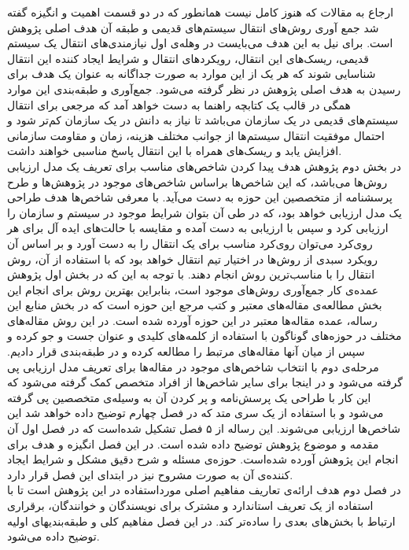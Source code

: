 ارجاع به مقالات که هنوز کامل نیست
همانطور که در دو قسمت اهمیت و انگیزه گفته شد جمع آوری روش‌های انتقال سیستم‌های قدیمی و طبقه آن هدف اصلی پژوهش است. برای نیل به این هدف می‌بایست در وهله‌ی اول نیازمندی‌های انتقال یک سیستم قدیمی، ریسک‌های این انتقال،  رویکردهای انتقال و شرایط ایجاد کننده این انتقال شناسایی شوند که هر یک از این موارد به صورت جداگانه  به عنوان یک هدف برای رسیدن به هدف اصلی پژوهش در نظر گرفته می‌شود. جمع‌آوری و طبقه‌بندی این موارد همگی در قالب یک کتابچه راهنما به دست خواهد آمد که مرجعی برای انتقال سیستم‌های قدیمی در یک سازمان ‌می‌باشد تا نیاز به دانش در یک سازمان کم‌تر شود و احتمال موفقیت انتقال سیستم‌ها از جوانب مختلف هزینه، زمان و 
مقاومت سازمانی افزایش یابد و ریسک‌های همراه با این انتقال پاسخ مناسبی خواهند داشت.
\\
در بخش دوم پژوهش هدف پیدا کردن شاخص‌های مناسب برای تعریف یک مدل ارزیابی روش‌ها می‌باشد، که این شاخص‌ها براساس شاخص‌های موجود در پژوهش‌ها و طرح پرسشنامه از متخصصین این حوزه به دست می‌آید. با معرفی شاخص‌ها هدف طراحی یک مدل ارزیابی خواهد بود، که در طی آن  بتوان شرایط موجود در سیستم و سازمان را ارزیابی کرد و سپس با ارزیابی به دست آمده و مقایسه با حالت‌های ایده آل برای هر روی‌کرد می‌توان روی‌کرد مناسب برای یک انتقال را به دست آورد و بر اساس آن رویکرد سبدی از روش‌ها در اختیار تیم انتقال خواهد بود که با استفاده از آن، روش انتقال را با مناسب‌ترین روش انجام دهند.
با توجه به این که در بخش اول پژوهش عمده‌ی کار جمع‌آوری روش‌های موجود است، بنابراین بهترین روش برای انجام این بخش مطالعه‌ی مقاله‌های معتبر و کتب مرجع این حوزه است که در بخش منابع این رساله، عمده مقاله‌ها معتبر در این حوزه آورده شده است. در این روش مقاله‌های مختلف در حوزه‌های گوناگون با استفاده از کلمه‌های کلیدی و عنوان  جست و جو کرده و سپس از میان   آنها مقاله‌های مرتبط را مطالعه کرده و در طبقه‌بندی قرار دادیم. مرحله‌ی دوم با انتخاب شاخص‌های موجود در مقاله‌ها برای تعریف مدل ارزیابی پی گرفته می‌شود و در اینجا برای سایر شاخص‌ها از افراد متخصص کمک گرفته می‌شود که این کار با طراحی یک پرسش‌نامه و پر کردن آن به وسیله‌ی متخصصین پی گرفته می‌شود و با استفاده از یک سری متد که در فصل  چهارم توضیح داده خواهد شد این شاخص‌ها ارزیابی می‌شوند.
این رساله از ۵ فصل تشکیل شده‌است که در فصل اول آن مقدمه و موضوع پژوهش توضیح داده شده است. در این فصل  انگیزه و هدف  برای انجام این پژوهش  آورده شده‌است. حوزه‌ی مسئله و شرح دقیق مشکل و شرایط ایجاد کننده‌ی آن به صورت مشروح نیز در ابتدای این فصل قرار دارد.
\\
در فصل دوم هدف ارائه‌ی تعاریف مفاهیم اصلی مورداستفاده در این پژوهش است تا با استفاده از یک تعریف استاندارد و مشترک برای نویسندگان و خوانندگان،  برقراری ارتباط با بخش‌های بعدی  را ساد‌ه‌تر کند. در این فصل مفاهیم کلی و طبقه‌بندیهای اولیه توضیح داده می‌شود.
